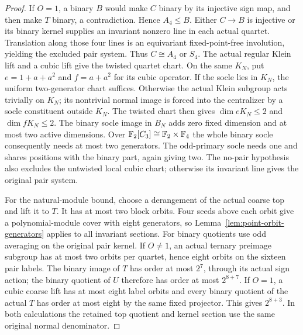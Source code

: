 \begin{proof}
If $O=1$, a binary $B$ would make $C$ binary by its injective sign
map, and then make $T$ binary, a contradiction. Hence $A_4\leq B$.
Either $C\to B$ is injective or its binary kernel supplies an invariant
nonzero line in each actual quartet. Translation along those four lines
is an equivariant fixed-point-free involution, yielding the excluded pair
system. Thus $C\cong A_4$ or $S_4$. The actual regular Klein lift and a
cubic lift give the twisted quartet chart. On the same $K_N$, put
$e=1+a+a^2$ and $f=a+a^2$ for its cubic operator. If the socle lies in
$K_N$, the uniform two-generator chart suffices. Otherwise the actual
Klein subgroup acts trivially on $K_N$; its nontrivial normal image is
forced into the centralizer by a socle constituent outside $K_N$.
The twisted chart then gives $\dim eK_N\leq2$ and $\dim fK_N\leq2$.
The binary socle image in $B_N$ adds zero fixed dimension and at most
two active dimensions. Over $\mathbb F_2[C_3]\cong\mathbb F_2\times\mathbb F_4$ the whole
binary socle consequently needs at most two generators. The odd-primary
socle needs one and shares positions with the binary part, again giving
two. The no-pair hypothesis also excludes the untwisted local cubic
chart; otherwise its invariant line gives the original pair system.

For the natural-module bound, choose a derangement of the actual coarse
top and lift it to $T$. It has at most two block orbits. Four seeds above
each orbit give a polynomial-module cover with eight generators, so
Lemma~\ref{lem:point-orbit-generators} applies to all invariant sections.
For binary quotients use odd averaging on the original pair kernel.
If $O\ne1$, an actual ternary preimage subgroup has at most two orbits
per quartet, hence eight orbits on the sixteen pair labels. The binary
image of $T$ has order at most $2^7$, through its actual sign action;
the binary quotient of $U$ therefore has order at most $2^{8+7}$.
If $O=1$, a cubic coarse lift has at most eight label orbits and every
binary quotient of the actual $T$ has order at most eight by the same
fixed projector. This gives $2^{8+3}$. In both calculations the retained
top quotient and kernel section use the same original normal denominator.
\end{proof}

